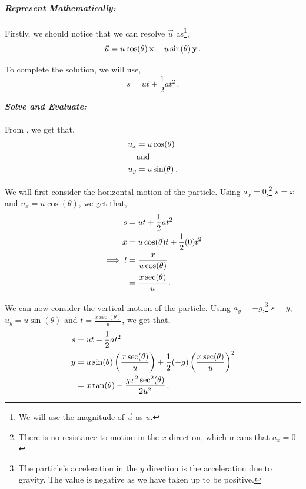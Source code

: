 \begin{subquestions}
	
	
	
\textbf{\textit{Represent Mathematically:}} \\ \\
Firstly, we should notice that we can resolve $\vec{u}$ as\footnote{We will use the magnitude of $\vec{u}$ as $u$.},
\begin{equation}
	\vec{u} = u\cos(\theta)\,\mathbf{x} + u\sin(\theta)\,\mathbf{y} \,. \label{2014:q6:Eqn1}
\end{equation}

To complete the solution, we will use,
\begin{equation}
	s = ut + \frac{1}{2}at^2 \,.
\end{equation}




\textbf{\textit{Solve and Evaluate:}} \\ \\
From , we get that.
\begin{align}
	u_x & = u\cos(\theta) \\
	& \text{and} \nonumber \\
	u_y & = u\sin(\theta) \,.
\end{align} 

We will first consider the horizontal motion of the particle. Using $a_x=0$,\footnote{There is no resistance to motion in the $x$ direction, which means that $a_x=0$} $s=x$ and $u_x=u\cos(\theta)$, we get that,
\begin{align}
	s & = ut + \frac{1}{2}at^2 \nonumber \\
	x & = u\cos(\theta)t + \frac{1}{2}(0)t^2 \nonumber \\
	\implies t & = \frac{x}{u\cos(\theta)} \nonumber \\
	           & = \frac{x\sec(\theta)}{u} \,.
\end{align}	

We can now consider the vertical motion of the particle. Using $a_y=-g$,\footnote{The particle's acceleration in the $y$ direction is the acceleration due to gravity. The value is negative as we have taken up to be positive.} $s=y$, $u_y=u\sin(\theta)$ and $t=\frac{x\sec(\theta)}{u}$, we get that,
\begin{align}
	s & = ut + \frac{1}{2}at^2 \nonumber \\
	y & = u\sin(\theta)\left(\frac{x\sec(\theta)}{u}\right) + \frac{1}{2}(-g)\left(\frac{x\sec(\theta)}{u}\right)^2 \nonumber \\
	  & = x\tan(\theta) - \frac{gx^2\sec^2(\theta)}{2u^2} \,.
\end{align}
	

\end{subquestions}
